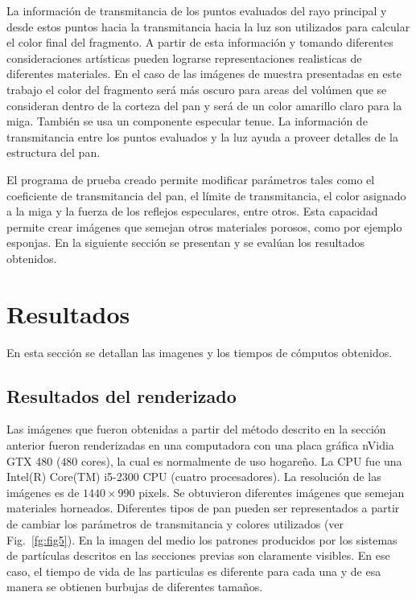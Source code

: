\documentclass[oneside,a4paper,spanish,links]{amca}
\begin{document}
La información de transmitancia de los puntos evaluados del rayo
principal y desde estos puntos hacia la transmitancia hacia la luz son
utilizados para calcular el color final del fragmento. A partir de
esta información y tomando diferentes consideraciones artísticas
pueden lograrse representaciones realisticas de diferentes
materiales. En el caso de las imágenes de muestra presentadas en este
trabajo el color del fragmento será más oscuro para areas del volúmen
que se consideran dentro de la corteza del pan y será de un color
amarillo claro para la miga. También se usa un componente especular
tenue. La información de transmitancia entre los puntos evaluados y la
luz ayuda a proveer detalles de la estructura del pan.

El programa de prueba creado permite modificar parámetros tales como
el coeficiente de transmitancia del pan, el límite de transmitancia,
el color asignado a la miga y la fuerza de los reflejos especulares,
entre otros. Esta capacidad permite crear imágenes que semejan otros
materiales porosos, como por ejemplo esponjas. En la siguiente sección
se presentan y se evalúan los resultados obtenidos.

\section{Resultados}

En esta sección se detallan las imagenes y los tiempos de
cómputos obtenidos. 

\subsection{Resultados del renderizado}

Las imágenes que fueron obtenidas a partir del método descrito en la
sección anterior fueron renderizadas en una computadora con una placa
gráfica nVidia GTX 480 ($480$ cores), la cual es normalmente de uso
hogareño. La CPU fue una Intel(R) Core(TM) i5-2300 CPU (cuatro
procesadores). La resolución de las imágenes es de $1440\times990$
pixels. 
Se obtuvieron diferentes imágenes que semejan materiales
horneados. Diferentes tipos de pan pueden ser representados a partir
de cambiar los parámetros de transmitancia y colores utilizados (ver
Fig.~\ref{fg:fig5}). En la imagen del medio los patrones producidos
por los sistemas de partículas descritos en las secciones previas son
claramente visibles. En ese caso, el tiempo de vida de las particulas
es diferente para cada una y de esa manera se obtienen burbujas de
diferentes tamaños.
\end{document}
